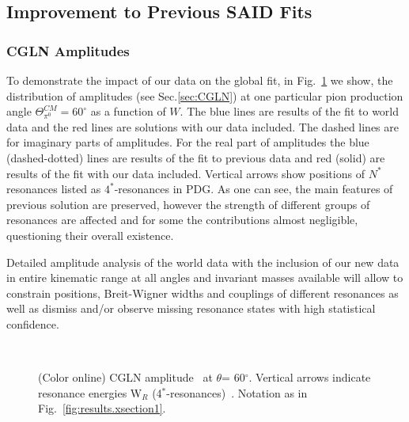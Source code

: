 \FloatBarrier
\subsection{Improvement to Previous SAID Fits}
\subsubsection{CGLN Amplitudes}
To demonstrate the impact of our data on the global fit, in Fig.~\ref{fig:CGLN1} we show, the distribution of amplitudes (see Sec.\ref{sec:CGLN}) at one particular pion production angle $\Theta^{CM}_{\pi^0}=60^{\circ}$ as a function of $W$.
The blue lines are results of the fit to world data and the red lines are solutions with our data included. The dashed lines are 
for imaginary parts of amplitudes. For the real part of amplitudes the blue (dashed-dotted) lines are results of the fit to previous 
data and red (solid) are results of the fit with our data included. Vertical arrows show positions of  $N^{*}$ resonances listed as 
$4^*$-resonances in PDG. As one can see, the main features of previous solution are preserved, however the
strength of different groups of resonances are affected and for some the contributions almost negligible, questioning their 
overall existence. 

Detailed amplitude analysis of the world data with the inclusion of our new data in entire kinematic range at all angles 
and invariant masses available will allow to constrain positions, Breit-Wigner widths and couplings of different resonances 
as well as dismiss and/or observe missing resonance states with high statistical confidence.

\begin{figure}[!ht]
  \centering
   \quad
   \\
   \quad
      \caption[CGLN amplitude at $\theta $= 60$^\circ$]{(Color online) CGLN amplitude~\protect\cite{CGLN}
                at $\theta $= 60$^\circ$.  Vertical arrows indicate 
		resonance energies W$_R$ (4$^\ast$-resonances)~\protect\cite{pdg2014}. 
		Notation as in Fig.~\protect\ref{fig:results.xsection1}.}
        \label{fig:CGLN1}
\end{figure}


